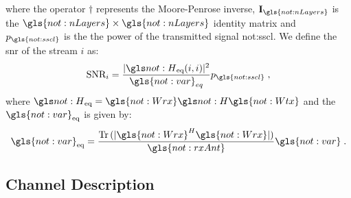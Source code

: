 \noindent where the operator $\dagger$ represents the Moore-Penrose inverse, $\mathbf{ I}_{\gls{not:nLayers}} $ is the $\gls{not:nLayers} \times \gls{not:nLayers}$ identity matrix and $p_{\gls{not:sscl}}$ is the the power of the transmitted signal \gls{not:sscl}.
%
We define the \gls{snr} of the stream $i$ as:
%
\begin{equation}
\label{eq.:snr}
\textrm{SNR}_i = \frac{ \abs{
		\channel_{\textrm{eq}} (i,i)
	}^2 }{\gls{not:var}_{eq}} p_{\gls{not:sscl}} \; ,
\end{equation}
%
where $\channel_{\textrm{eq}} = \gls{not:Wrx} \channel \gls{not:Wtx}$ and the $\gls{not:var}_{\textrm{eq}}$ is given by:
%
\begin{equation}
\gls{not:var}_{\textrm{eq}} = \frac{
	\Tr \,  (\abs{ \gls{not:Wrx}^H \gls{not:Wrx} } )}
{\gls{not:rxAnt}}
\gls{not:var} \;.
\end{equation}

\subsection{Channel Description}


